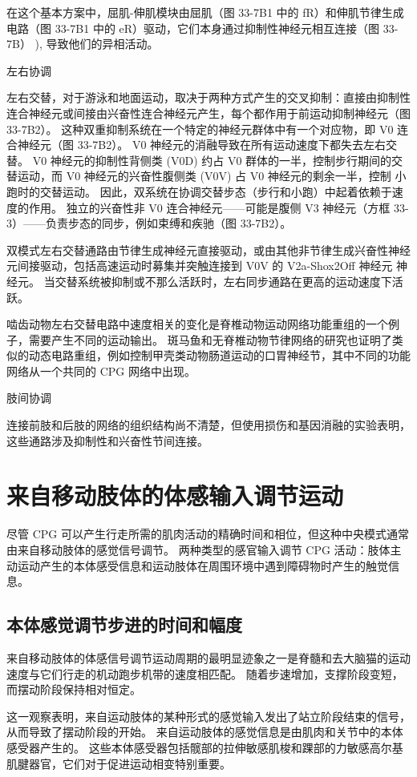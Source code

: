 在这个基本方案中，屈肌-伸肌模块由屈肌（图 33-7B1 中的 fR）和伸肌节律生成电路（图 33-7B1 中的 eR）驱动，它们本身通过抑制性神经元相互连接（图 33-7B） ), 导致他们的异相活动。

左右协调

左右交替，对于游泳和地面运动，取决于两种方式产生的交叉抑制：直接由抑制性连合神经元或间接由兴奋性连合神经元产生，每个都作用于前运动抑制神经元（图 33-7B2）。 这种双重抑制系统在一个特定的神经元群体中有一个对应物，即 V0 连合神经元（图 33-7B2）。 V0 神经元的消融导致在所有运动速度下都失去左右交替。 V0 神经元的抑制性背侧类 (V0D) 约占 V0 群体的一半，控制步行期间的交替运动，而 V0 神经元的兴奋性腹侧类 (V0V) 占 V0 神经元的剩余一半，控制 小跑时的交替运动。 因此，双系统在协调交替步态（步行和小跑）中起着依赖于速度的作用。 独立的兴奋性非 V0 连合神经元——可能是腹侧 V3 神经元（方框 33-3）——负责步态的同步，例如束缚和疾驰（图 33-7B2）。

双模式左右交替通路由节律生成神经元直接驱动，或由其他非节律生成兴奋性神经元间接驱动，包括高速运动时募集并突触连接到 V0V 的 V2a-Shox2Off 神经元 神经元。 当交替系统被抑制或不那么活跃时，左右同步通路在更高的运动速度下活跃。

啮齿动物左右交替电路中速度相关的变化是脊椎动物运动网络功能重组的一个例子，需要产生不同的运动输出。 斑马鱼和无脊椎动物节律网络的研究也证明了类似的动态电路重组，例如控制甲壳类动物肠道运动的口胃神经节，其中不同的功能网络从一个共同的 CPG 网络中出现。

肢间协调

连接前肢和后肢的网络的组织结构尚不清楚，但使用损伤和基因消融的实验表明，这些通路涉及抑制性和兴奋性节间连接。

\section{来自移动肢体的体感输入调节运动}
尽管 CPG 可以产生行走所需的肌肉活动的精确时间和相位，但这种中央模式通常由来自移动肢体的感觉信号调节。 两种类型的感官输入调节 CPG 活动：肢体主动运动产生的本体感受信息和运动肢体在周围环境中遇到障碍物时产生的触觉信息。

\subsection{本体感觉调节步进的时间和幅度}
来自移动肢体的体感信号调节运动周期的最明显迹象之一是脊髓和去大脑猫的运动速度与它们行走的机动跑步机带的速度相匹配。 随着步速增加，支撑阶段变短，而摆动阶段保持相对恒定。

这一观察表明，来自运动肢体的某种形式的感觉输入发出了站立阶段结束的信号，从而导致了摆动阶段的开始。 来自运动肢体的感觉信息是由肌肉和关节中的本体感受器产生的。 这些本体感受器包括髋部的拉伸敏感肌梭和踝部的力敏感高尔基肌腱器官，它们对于促进运动相变特别重要。

